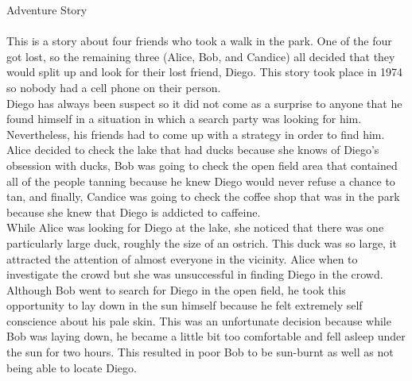 \documentclass{article}
\begin{document}
\large{Adventure Story} \\ \\
This is a story about four friends who took a walk in the park. One of the four got lost, so the remaining three (Alice, Bob, and Candice) all decided that they would split up and look for their lost friend, Diego. This story took place in 1974 so nobody had a cell phone on their person.\\
Diego has always been suspect so it did not come as a surprise to anyone that he found himself in a situation in which a search party was looking for him. Nevertheless, his friends had to come up with a strategy in order to find him. Alice decided to check the lake that had ducks because she knows of Diego's obsession with ducks, Bob was going to check the open field area that contained all of the people tanning because he knew Diego would never refuse a chance to tan, and finally, Candice was going to check the coffee shop that was in the park because she knew that Diego is addicted to caffeine.\\
While Alice was looking for Diego at the lake, she noticed that there was one particularly large duck, roughly the size of an ostrich. This duck was so large, it attracted the attention of almost everyone in the vicinity. Alice when to investigate the crowd but she was unsuccessful in finding Diego in the crowd. \\
Although Bob went to search for Diego in the open field, he took this opportunity to lay down in the sun himself because he felt extremely self conscience about his pale skin. This was an unfortunate decision because while Bob was laying down, he became a little bit too comfortable and fell asleep under the sun for two hours. This resulted in poor Bob to be sun-burnt as well as not being able to locate Diego.\\
\end{document}
